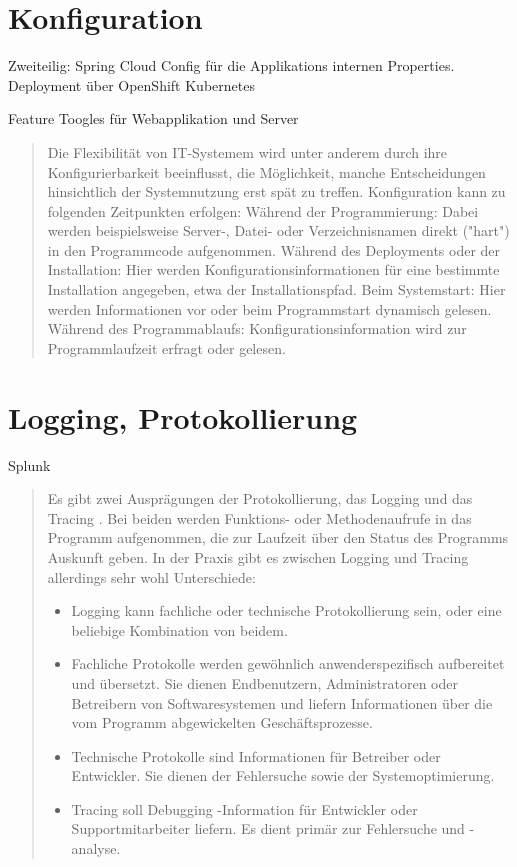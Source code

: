 \section{Konfiguration}

Zweiteilig:
Spring Cloud Config für die Applikations internen Properties.
Deployment über OpenShift Kubernetes

Feature Toogles für Webapplikation und Server

\begin{quote}
	Die Flexibilität von IT-Systemem wird unter anderem durch ihre Konfigurierbarkeit beeinflusst, die Möglichkeit, manche Entscheidungen hinsichtlich der Systemnutzung erst spät zu treffen. Konfiguration kann zu folgenden Zeitpunkten erfolgen:
	Während der Programmierung: Dabei werden beispielsweise Server-, Datei- oder Verzeichnisnamen direkt ("hart") in den Programmcode aufgenommen.
	Während des Deployments oder der Installation: Hier werden Konfigurationsinformationen für eine bestimmte Installation angegeben, etwa der Installationspfad.
	Beim Systemstart: Hier werden Informationen vor oder beim Programmstart dynamisch gelesen.
	Während des Programmablaufs: Konfigurationsinformation wird zur Programmlaufzeit erfragt oder gelesen.
\end{quote}

\section{Logging, Protokollierung}

Splunk

\begin{quote}
	
	Es gibt zwei Ausprägungen der Protokollierung, das Logging und das Tracing . Bei beiden werden Funktions- oder Methodenaufrufe in das Programm aufgenommen, die zur Laufzeit über den Status des Programms Auskunft geben.
	In der Praxis gibt es zwischen Logging und Tracing allerdings sehr wohl Unterschiede:
	\begin{itemize}
		\item Logging kann fachliche oder technische Protokollierung sein, oder eine beliebige Kombination von beidem.
		\item Fachliche Protokolle werden gewöhnlich anwenderspezifisch aufbereitet und übersetzt. Sie dienen Endbenutzern, Administratoren oder Betreibern von Softwaresystemen und liefern Informationen über die vom Programm abgewickelten Geschäftsprozesse.
		\item Technische Protokolle sind Informationen für Betreiber oder Entwickler. Sie dienen der Fehlersuche sowie der Systemoptimierung.
		\item Tracing soll Debugging -Information für Entwickler oder Supportmitarbeiter liefern. Es dient primär zur Fehlersuche und -analyse.
	\end{itemize}
\end{quote}

